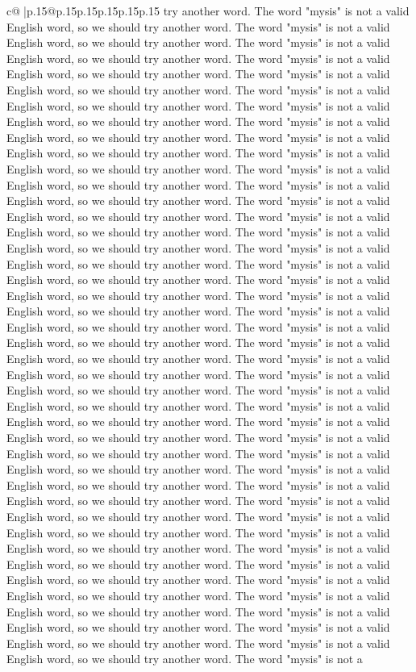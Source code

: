 \documentclass{article}
\begin{document}
{\begin{supertabular}{c@{$\;$}|p{.15\linewidth}@{}p{.15\linewidth}p{.15\linewidth}p{.15\linewidth}p{.15\linewidth}p{.15\linewidth}}
{{{try another word. The word "mysis" is not a valid English word, so we should try another word. The word "mysis" is not a valid English word, so we should try another word. The word "mysis" is not a valid English word, so we should try another word. The word "mysis" is not a valid English word, so we should try another word. The word "mysis" is not a valid English word, so we should try another word. The word "mysis" is not a valid English word, so we should try another word. The word "mysis" is not a valid English word, so we should try another word. The word "mysis" is not a valid English word, so we should try another word. The word "mysis" is not a valid English word, so we should try another word. The word "mysis" is not a valid English word, so we should try another word. The word "mysis" is not a valid English word, so we should try another word. The word "mysis" is not a valid English word, so we should try another word. The word "mysis" is not a valid English word, so we should try another word. The word "mysis" is not a valid English word, so we should try another word. The word "mysis" is not a valid English word, so we should try another word. The word "mysis" is not a valid English word, so we should try another word. The word "mysis" is not a valid English word, so we should try another word. The word "mysis" is not a valid English word, so we should try another word. The word "mysis" is not a valid English word, so we should try another word. The word "mysis" is not a valid English word, so we should try another word. The word "mysis" is not a valid English word, so we should try another word. The word "mysis" is not a valid English word, so we should try another word. The word "mysis" is not a valid English word, so we should try another word. The word "mysis" is not a valid English word, so we should try another word. The word "mysis" is not a valid English word, so we should try another word. The word "mysis" is not a valid English word, so we should try another word. The word "mysis" is not a valid English word, so we should try another word. The word "mysis" is not a valid English word, so we should try another word. The word "mysis" is not a valid English word, so we should try another word. The word "mysis" is not a valid English word, so we should try another word. The word "mysis" is not a valid English word, so we should try another word. The word "mysis" is not a valid English word, so we should try another word. The word "mysis" is not a valid English word, so we should try another word. The word "mysis" is not a valid English word, so we should try another word. The word "mysis" is not a valid English word, so we should try another word. The word "mysis" is not a valid English word, so we should try another word. The word "mysis" is not a valid English word, so we should try another word. The word "mysis" is not a valid English word, so we should try another word. The word "mysis" is not a valid English word, so we should try another word. The word "mysis" is not a valid English word, so we should try another word. The word "mysis" is not a valid English word, so we should try another word. The word "mysis" is not a }}}
\end{supertabular}}
\end{document}

